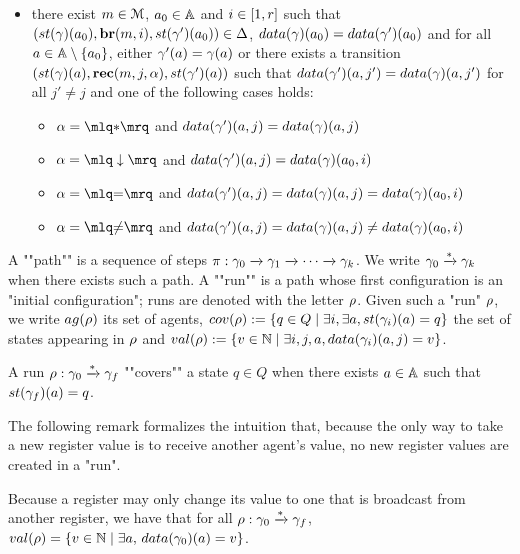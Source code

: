 \begin{definition}[Semantics]
\begin{itemize}
		\item there exist $m \in \mathcal{M}$, $a_0 \in \mathbb{A}$ and $i \in [1,r]$ such that $(\st{\config}(a_0),\br{\amessage}{i}, \st{\config'}(a_0)) \in \transitions$, $\data{\config}(a_0) = \data{\config'}(a_0)$ and for all $a \in \mathbb{A}\setminus \{a_0\}$, either $\gamma'(a) = \gamma(a)$ or there exists a transition $(\st{\config}(a),\rec{m}{j}{\anact},\st{\config'}(a))$
		such that $\data{\config'}(a, j') = \data{\config}(a, j')$ for all $j' \neq j$ and one of the following cases holds:
		\begin{itemize}
				\item $\anact = \quotemarks{\dummyact}$ 
				and $\data{\config'}(a,j) = \data{\config}(a,j)$
				\item $\anact = \quotemarks{\enregact}$ and $\data{\config'}(a,j) = \data{\config}(a_0,i)$
				\item $\anact = \quotemarks{\eqtestact}$ and $\data{\config'}(a,j) = \data{\config}(a,j) =\data{\config}(a_0,i)$
				\item $\anact = \quotemarks{\diseqtestact}$ and $\data{\config'}(a,j) = \data{\config}(a,j) \ne \data{\config}(a_0,i)$
			\end{itemize}
		\end{itemize}
	
	\AP A ""path"" is a sequence of steps $\pi : \gamma_0 \xrightarrow{} \gamma_1 \xrightarrow{} \cdots \xrightarrow{} \gamma_k$. 
	We write $\gamma_0 \xrightarrow{*} \gamma_k$ when there exists such a path.
	A ""run"" is a path whose first configuration is an "initial configuration"; runs are denoted with the letter $\rho$.  
	Given such a "run" $\rho$, we write $\agentsof{\run}$ its set of agents, $\statesin{\run}:= \set{q \in Q \mid \exists i, \exists a, \st{\config_i}(a) = q}$ the set of states appearing in $\rho$ and $\valsof{\run} := \set{\aval \in \nats \mid \exists i,j, a, \data{\config_i}(a,j) = \aval}$.  
	
	\AP A run $\rho: \gamma_0 \xrightarrow{*} \gamma_f$ ""covers"" a state $q \in Q$ when there exists $a \in \mathbb{A}$ such that $\st{\config_f}(a) = q$. 
	

	
	
The following remark formalizes the intuition that, because the only way to take a new register value is to receive another agent's value, no new register values are created in a "run".
\begin{remark}
	\label{rem:run_no_new_register_values}
	Because a register may only change its value to one that is broadcast from another register, we have that for all $\rho: \gamma_0 \xrightarrow{*} \gamma_f$, $\valsof{\run} = \set{\aval \in \nats \mid \exists a, \, \data{\config_0}(a) = \aval}$.
\end{remark}


\end{definition}
